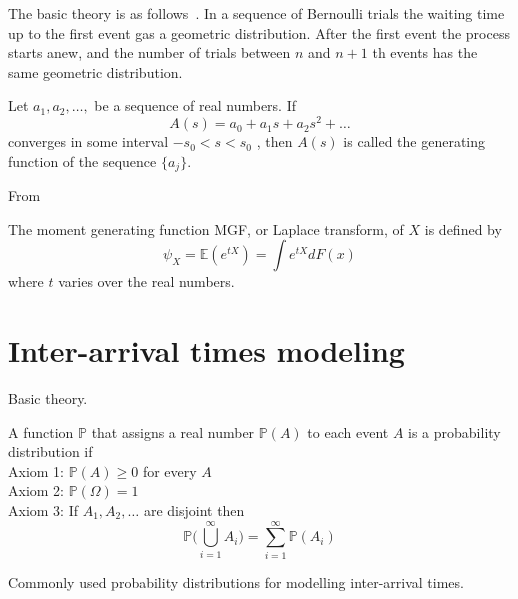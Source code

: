 The basic theory is as follows~\cite{feller2008introduction}.
In a sequence of Bernoulli trials the waiting time up to the first event gas a geometric distribution.
After the first event the process starts anew, and the number of trials between $n$ and $n+1$ th events has the same geometric distribution.
\begin{definition}
	Let $a_1, a_2, \dots, $ be a sequence of real numbers. If 
	\begin{equation}
		A(s) = a_0 + a_1 s + a_2 s^2 + \dots 
	\end{equation}
    converges in some interval $-s_0 < s < s_0 $ , then $A(s)$ is called the generating function of the sequence $\{a_j\}$. 
\end{definition}

From\cite{wasserman2013all}
\begin{definition}
	The moment generating function MGF, or Laplace transform, of $X$ is defined by
	\begin{equation}
		\psi_X = \mathbb{E}(e^{tX}) = \int e^{tX} dF(x) 
	\end{equation}
where $t$ varies over the real numbers.
\end{definition}

\section{Inter-arrival times modeling}

Basic theory.
\begin{definition}
	A function $\mathbb{P}$ that assigns a real number $\mathbb{P}(A)$ to each event $A$ is a probability distribution if \\
	Axiom 1: $\mathbb{P}(A) \geq 0$ for every $A$\\
	Axiom 2: $\mathbb{P}(\Omega) = 1$\\
	Axiom 3: If $A_1, A_2, \dots $ are disjoint then 
	\begin{equation}
		\mathbb{P} \Big( \bigcup\limits_{i=1}^{\infty} A_i  \Big) = \sum_{i=1}^{\infty} \mathbb{P}(A_i)
	\end{equation}
\end{definition}
Commonly used probability distributions for modelling inter-arrival times.
